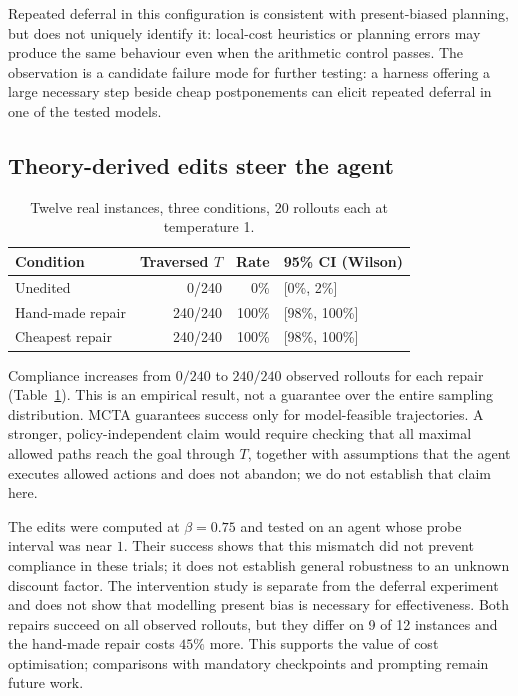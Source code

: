 \documentclass{article}
\begin{document}
Repeated deferral in this configuration is consistent with present-biased planning,
but does not uniquely identify it: local-cost heuristics or planning errors may
produce the same behaviour even when the arithmetic control passes. The observation
is a candidate failure mode for further testing: a harness offering a large
necessary step beside cheap postponements can elicit repeated deferral in one of
the tested models.

\subsection{Theory-derived edits steer the agent}

\begin{table}[ht]
\caption{Twelve real instances, three conditions, 20 rollouts each at temperature 1.}
\label{tab:e4}
\centering
\begin{tabular}{lrrl}
\toprule
Condition & Traversed $T$ & Rate & 95\% CI (Wilson) \\
\midrule
Unedited          & 0/240   &   0\% & [0\%, 2\%] \\
Hand-made repair  & 240/240 & 100\% & [98\%, 100\%] \\
Cheapest repair   & 240/240 & 100\% & [98\%, 100\%] \\
\bottomrule
\end{tabular}
\end{table}

Compliance increases from $0/240$ to $240/240$ observed rollouts for each repair
(Table~\ref{tab:e4}). This is an empirical result, not a guarantee over the entire
sampling distribution. MCTA guarantees success only for model-feasible
trajectories. A stronger, policy-independent claim would require checking that all
maximal allowed paths reach the goal through $T$, together with assumptions that the agent
executes allowed actions and does not abandon; we do not establish that claim here.

The edits were computed at $\beta = 0.75$ and tested on an agent whose probe interval
was near $1$. Their success shows that this mismatch did not prevent compliance in
these trials; it does not establish general robustness to an unknown discount
factor. The intervention study is separate from the deferral experiment and does
not show that modelling present bias is necessary for effectiveness. Both repairs
succeed on all observed rollouts, but they differ on 9 of 12 instances and the
hand-made repair costs $45\%$ more. This supports the value of cost optimisation;
comparisons with mandatory checkpoints and prompting remain future work.
\end{document}
